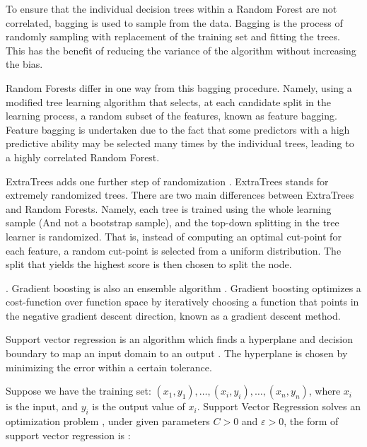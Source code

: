 \documentclass[final,3p,times,twocolumn,numbers]{elsarticle}
\begin{document}
To ensure that the individual decision trees within a Random Forest are not correlated, bagging is used to sample from the data. Bagging is the process of randomly sampling with replacement of the training set and fitting the trees. This has the benefit of reducing the variance of the algorithm without increasing the bias. 

Random Forests differ in one way from this bagging procedure. Namely, using a modified tree learning algorithm that selects, at each candidate split in the learning process, a random subset of the features, known as feature bagging. Feature bagging is undertaken due to the fact that some predictors with a high predictive ability may be selected many times by the individual trees, leading to a highly correlated Random Forest.

ExtraTrees adds one further step of randomization \cite{Fike1988}. ExtraTrees stands for extremely randomized trees. There are two main differences between ExtraTrees and Random Forests. Namely, each tree is trained using the whole learning sample (And not a bootstrap sample), and the top-down splitting in the tree learner is randomized. That is, instead of computing an optimal cut-point for each feature, a random cut-point is selected from a uniform distribution. The split that yields the highest score is then chosen to split the node. 


. Gradient boosting is also an ensemble algorithm \cite{316}. Gradient boosting optimizes a cost-function over function space by iteratively choosing a function that points in the negative gradient descent direction, known as a gradient descent method.

 Support vector regression is an algorithm which finds a hyperplane and decision boundary to map an input domain to an output \cite{Cortes1995}. The hyperplane is chosen by minimizing the error within a certain tolerance.

Suppose we have the training set: $(x_1,y_1), \ldots,(x_i,y_i),\ldots,(x_n,y_n)$, where $x_i$ is the input, and $y_i$ is the output value of $x_i$. Support Vector Regression solves an optimization problem \cite{Chen2004, Shu2006}, under given parameters $C>0$ and $\varepsilon >0$, the form of support vector regression is \cite{Drucker1997}: 
\end{document}
